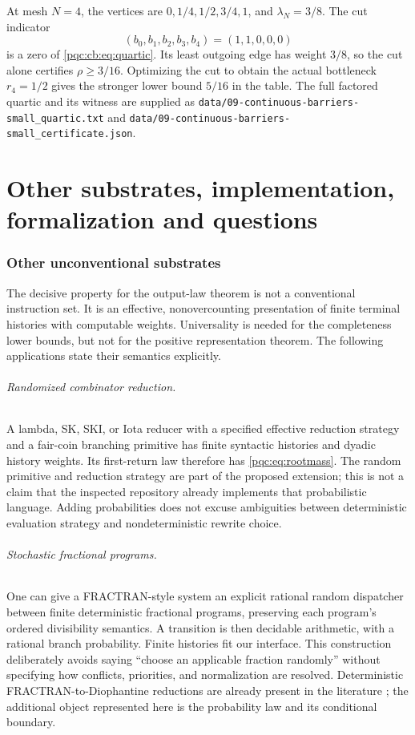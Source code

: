 \documentclass[11pt,letterpaper]{article}
\numberwithin{equation}{section}
\theoremstyle{definition}
\theoremstyle{remark}
\newcommand{\code}[1]{\nolinkurl{#1}}
\begin{document}
At mesh $N=4$, the vertices are $0,1/4,1/2,3/4,1$, and
$\lambda_N=3/8$.  The cut indicator
\[
 (b_0,b_1,b_2,b_3,b_4)=(1,1,0,0,0)
\]
is a zero of \eqref{pqc:cb:eq:quartic}.  Its least outgoing edge has weight $3/8$,
so the cut alone certifies $\rho\ge3/16$.  Optimizing the cut to obtain the
actual bottleneck $r_4=1/2$ gives the stronger lower bound $5/16$ in the table.
The full factored quartic and its witness are supplied as
\code{data/09-continuous-barriers-small_quartic.txt} and \code{data/09-continuous-barriers-small_certificate.json}.

\part{Other substrates, implementation, formalization and questions}
\label{pqc:part:rest}

\section{Other unconventional substrates}\label{pqc:sec:substrates}

The decisive property for the output-law theorem is not a conventional
instruction set. It is an effective, nonovercounting presentation of finite
terminal histories with computable weights. Universality is needed for the
completeness lower bounds, but not for the positive representation theorem.
The following applications state their semantics explicitly.

\paragraph{Randomized combinator reduction.}
A lambda, SK, SKI, or Iota reducer with a specified effective reduction
strategy and a fair-coin branching primitive has finite syntactic
histories and dyadic history weights. Its first-return law therefore has
\eqref{pqc:eq:rootmass}. The random primitive and reduction strategy are part of
the proposed extension; this is not a claim that the inspected repository
already implements that probabilistic language. Adding probabilities does
not excuse ambiguities between deterministic evaluation strategy and
nondeterministic rewrite choice.

\paragraph{Stochastic fractional programs.}
One can give a FRACTRAN-style system an explicit rational random dispatcher
between finite deterministic fractional programs, preserving each program's
ordered divisibility semantics. A transition is then decidable arithmetic,
with a rational branch probability. Finite histories fit our interface.
This construction deliberately avoids saying ``choose an applicable
fraction randomly'' without specifying how conflicts, priorities, and
normalization are resolved. Deterministic FRACTRAN-to-Diophantine reductions
are already present in the literature \cite{larchey-forster}; the additional
object represented here is the probability law and its conditional boundary.
\end{document}
